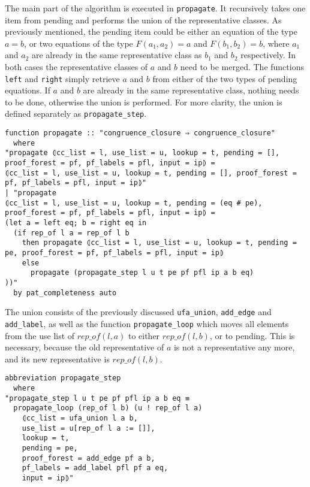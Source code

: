 The main part of the algorithm is executed in \lstinline{propagate}. It recursively takes one item from pending and performs the union of the representative classes. As previously mentioned, the pending item could be either an equation of the type $a = b$, or two equations of the type $F(a_1, a_2) = a$ and $F(b_1, b_2) = b$, where $a_1$ and $a_2$ are already in the same representative class as $b_1$ and $b_2$ respectively. In both cases the representative classes of $a$ and $b$ need to be merged. The functions \lstinline{left} and \lstinline{right} simply retrieve $a$ and $b$ from either of the two types of pending equations. If $a$ and $b$ are already in the same representative class, nothing needs to be done, otherwise the union is performed. For more clarity, the union is defined separately as \lstinline{propagate_step}.

\begin{lstlisting}
function propagate :: "congruence_closure ⇒ congruence_closure"
  where
"propagate ⦇cc_list = l, use_list = u, lookup = t, pending = [], proof_forest = pf, pf_labels = pfl, input = ip⦈ =
⦇cc_list = l, use_list = u, lookup = t, pending = [], proof_forest = pf, pf_labels = pfl, input = ip⦈"
| "propagate
⦇cc_list = l, use_list = u, lookup = t, pending = (eq # pe), proof_forest = pf, pf_labels = pfl, input = ip⦈ =
(let a = left eq; b = right eq in
  (if rep_of l a = rep_of l b
    then propagate ⦇cc_list = l, use_list = u, lookup = t, pending = pe, proof_forest = pf, pf_labels = pfl, input = ip⦈
    else
      propagate (propagate_step l u t pe pf pfl ip a b eq)
))"
  by pat_completeness auto
\end{lstlisting}

The union consists of the previously discussed \lstinline{ufa_union}, \lstinline{add_edge} and \lstinline{add_label}, as well as the function \lstinline|propagate_loop| which moves all elements from the use list of $rep\_of(l,a)$ to either $rep\_of(l, b)$, or to pending. This is necessary, because the old representative of $a$ is not a representative any more, and its new representative is  $rep\_of(l, b)$.

\begin{lstlisting}
abbreviation propagate_step
  where
"propagate_step l u t pe pf pfl ip a b eq ≡
  propagate_loop (rep_of l b) (u ! rep_of l a)
    ⦇cc_list = ufa_union l a b,
    use_list = u[rep_of l a := []],
    lookup = t,
    pending = pe,
    proof_forest = add_edge pf a b,
    pf_labels = add_label pfl pf a eq,
    input = ip⦈"
\end{lstlisting}

